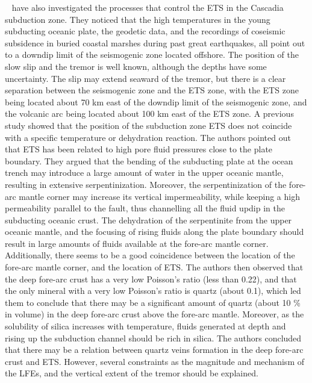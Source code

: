 \documentclass[draft]{agujournal2019}
\begin{document}
~ have also investigated the processes that control the ETS in the Cascadia subduction zone. They noticed that the high temperatures in the young subducting oceanic plate, the geodetic data, and the recordings of coseismic subsidence in buried coastal marshes during past great earthquakes, all point out to a downdip limit of the seismogenic zone located offshore. The position of the slow slip and the tremor is well known, although the depths have some uncertainty. The slip may extend seaward of the tremor, but there is a clear separation between the seismogenic zone and the ETS zone, with the ETS zone being located about 70 km east of the downdip limit of the seismogenic zone, and the volcanic arc being located about 100 km east of the ETS zone. A previous study showed that the position of the subduction zone ETS does not coincide with a specific temperature or dehydration reaction. The authors pointed out that ETS has been related to high pore fluid pressures close to the plate boundary. They argued that the bending of the subducting plate at the ocean trench may introduce a large amount of water in the upper oceanic mantle, resulting in extensive serpentinization. Moreover, the serpentinization of the fore-arc mantle corner may increase its vertical impermeability, while keeping a high permeability parallel to the fault, thus channelling all the fluid updip in the subducting oceanic crust. The dehydration of the serpentinite from the upper oceanic mantle, and the focusing of rising fluids along the plate boundary should result in large amounts of fluids available at the fore-arc mantle corner. Additionally, there seems to be a good coincidence between the location of the fore-arc mantle corner, and the location of ETS. The authors then observed that the deep fore-arc crust has a very low Poisson's ratio (less than 0.22), and that the only mineral with a very low Poisson's ratio is quartz (about 0.1), which led them to conclude that there may be a significant amount of quartz (about 10 \% in volume) in the deep fore-arc crust above the fore-arc mantle. Moreover, as the solubility of silica increases with temperature, fluids generated at depth and rising up the subduction channel should be rich in silica. The authors concluded that there may be a relation between quartz veins formation in the deep fore-arc crust and ETS. However, several constraints as the magnitude and mechanism of the LFEs, and the vertical extent of the tremor should be explained. \\
\end{document}
